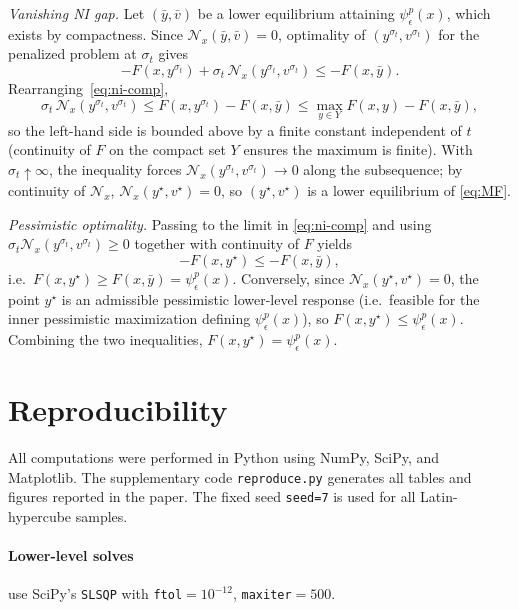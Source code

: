 \documentclass[11pt]{article}
\theoremstyle{definition}
\newcommand{\eps}{\epsilon}
\begin{document}
\emph{Vanishing NI gap.}
Let $(\bar y,\bar v)$ be a lower equilibrium attaining
$\psi_\eps^p(x)$, which exists by compactness. Since
$\mathcal N_x(\bar y,\bar v)=0$, optimality of
$(y^{\sigma_t},v^{\sigma_t})$ for the penalized problem at
$\sigma_t$ gives
\begin{equation}\label{eq:ni-comp}
  -F(x,y^{\sigma_t})+\sigma_t\,\mathcal N_x(y^{\sigma_t},v^{\sigma_t})
  \le -F(x,\bar y).
\end{equation}
Rearranging~\eqref{eq:ni-comp},
\begin{equation}\label{eq:ni-bound}
  \sigma_t\,\mathcal N_x(y^{\sigma_t},v^{\sigma_t})
  \le F(x,y^{\sigma_t})-F(x,\bar y)
  \le \max_{y\in Y}F(x,y)-F(x,\bar y),
\end{equation}
so the left-hand side is bounded above by a finite constant
independent of $t$ (continuity of $F$ on the compact set $Y$
ensures the maximum is finite). With $\sigma_t\uparrow\infty$, the
inequality forces $\mathcal N_x(y^{\sigma_t},v^{\sigma_t})\to 0$
along the subsequence; by continuity of $\mathcal N_x$,
$\mathcal N_x(y^\star,v^\star)=0$, so $(y^\star,v^\star)$ is a
lower equilibrium of \eqref{eq:MF}.

\emph{Pessimistic optimality.}
Passing to the limit in \eqref{eq:ni-comp} and using
$\sigma_t\mathcal N_x(y^{\sigma_t},v^{\sigma_t})\ge 0$ together
with continuity of $F$ yields
\[
  -F(x,y^\star)\le -F(x,\bar y),
\]
i.e.\ $F(x,y^\star)\ge F(x,\bar y)=\psi_\eps^p(x)$. Conversely,
since $\mathcal N_x(y^\star,v^\star)=0$, the point $y^\star$ is an
admissible pessimistic lower-level response (i.e.\ feasible for
the inner pessimistic maximization defining $\psi_\eps^p(x)$), so
$F(x,y^\star)\le\psi_\eps^p(x)$. Combining the two inequalities,
$F(x,y^\star)=\psi_\eps^p(x)$.

\section{Reproducibility}\label{sec:repro}
All computations were performed in Python using NumPy, SciPy, and
Matplotlib. The supplementary code \texttt{reproduce.py} generates
all tables and figures reported in the paper. The fixed seed
\texttt{seed=7} is used for all Latin-hypercube samples.

\paragraph{Lower-level solves} use SciPy's \texttt{SLSQP} with
\texttt{ftol}$=10^{-12}$, \texttt{maxiter}$=500$.
\end{document}
